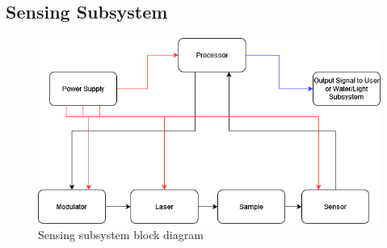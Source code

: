 \subsection{Sensing Subsystem}
\begin{figure}[H]
    \caption{Sensing subsystem block diagram}
    \centering
    \includegraphics[width=\textwidth]{images/IRSensorBlockDiagram.png}
\end{figure}